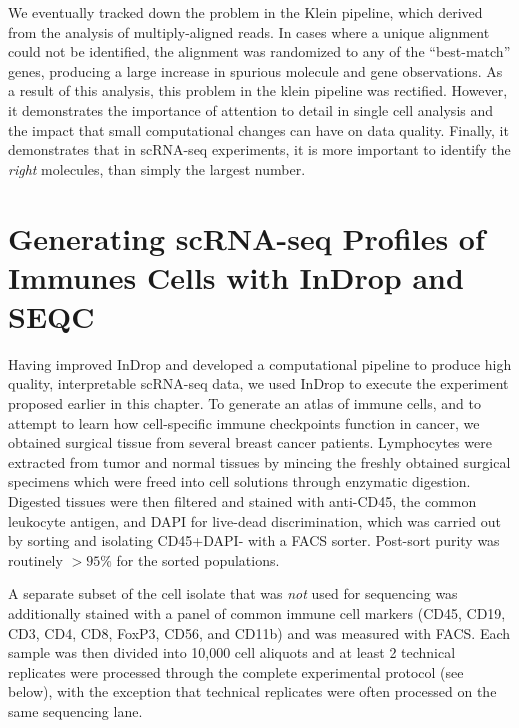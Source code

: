 We eventually tracked down the problem in the Klein pipeline, which derived from the analysis of multiply-aligned reads. In cases where a unique alignment could not be identified, the alignment was randomized to any of the ``best-match'' genes, producing a large increase in spurious molecule and gene observations. 
As a result of this analysis, this problem in the klein pipeline was rectified. 
However, it demonstrates the importance of attention to detail in single cell analysis and the impact that small computational changes can have on data quality. 
Finally, it demonstrates that in scRNA-seq experiments, it is more important to identify the \textit{right} molecules, than simply the largest number. 


\section{Generating scRNA-seq Profiles of Immunes Cells with InDrop and SEQC} %

Having improved InDrop and developed a computational pipeline to produce high quality, interpretable scRNA-seq data, we used InDrop to execute the experiment proposed earlier in this chapter. 
To generate an atlas of immune cells, and to attempt to learn how cell-specific immune checkpoints function in cancer, we obtained surgical tissue from several breast cancer patients. 
Lymphocytes were extracted from tumor and normal tissues by mincing the freshly obtained surgical specimens which were freed into cell solutions through enzymatic digestion. 
Digested tissues were then filtered and stained with anti-CD45, the common leukocyte antigen, and DAPI for live-dead discrimination, which was carried out by sorting and isolating CD45+DAPI- with a FACS sorter.  
Post-sort purity was routinely $>95\%$ for the sorted populations.

A separate subset of the cell isolate that was \textit{not} used for sequencing was additionally stained with a panel of common immune cell markers (CD45, CD19, CD3, CD4, CD8, FoxP3, CD56, and CD11b) and was measured with FACS\@. 
Each sample was then divided into 10,000 cell aliquots and at least 2 technical replicates were processed through the complete experimental protocol (see below), with the exception that technical replicates were often processed on the same sequencing lane. 

